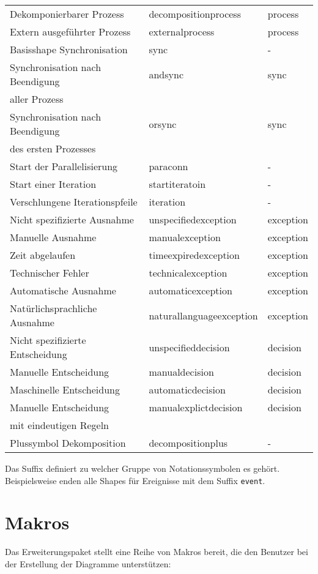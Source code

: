 \begin{longtable}{lll}
        Dekomponierbarer Prozess & decompositionprocess & process \\
        Extern ausgeführter Prozess & externalprocess & process \\
        Basisshape Synchronisation & sync & - \\
        Synchronisation nach Beendigung & andsync & sync \\
        aller Prozess & & \\
        Synchronisation nach Beendigung & orsync & sync \\
        des ersten Prozesses & & \\
        Start der Parallelisierung & paraconn & - \\
        Start einer Iteration & startiteratoin & - \\
        Verschlungene Iterationspfeile & iteration & - \\
        Nicht spezifizierte Ausnahme & unspecifiedexception & exception \\
        Manuelle Ausnahme & manualexception & exception \\
        Zeit abgelaufen & timeexpiredexception & exception \\
        Technischer Fehler & technicalexception & exception \\
        Automatische Ausnahme & automaticexception & exception \\
        Natürlichsprachliche Ausnahme & naturallanguageexception & exception \\
        Nicht spezifizierte Entscheidung & unspecifieddecision & decision \\
        Manuelle Entscheidung & manualdecision & decision \\
        Maschinelle Entscheidung & automaticdecision & decision \\
        Manuelle Entscheidung & manualexplictdecision & decision \\
        mit eindeutigen Regeln & & \\
        Plussymbol Dekomposition & decompositionplus & - \\
        \bottomrule    
\end{longtable}
\noindent Das Suffix definiert zu welcher Gruppe von Notationssymbolen es gehört. Beispielsweise enden alle Shapes für Ereignisse mit dem Suffix \texttt{event}.\newpage

\section{Makros}
\label{sec:Makros}
Das Erweiterungspaket stellt eine Reihe von Makros bereit, die den Benutzer bei der Erstellung der Diagramme unterstützen:\medskip

